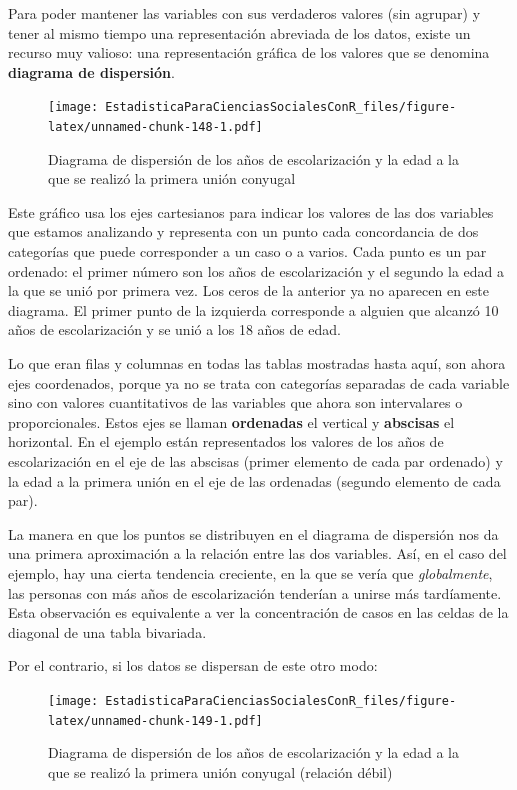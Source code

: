 \documentclass[]{book}
\begin{document}
Para poder mantener las variables con sus verdaderos valores (sin
agrupar) y tener al mismo tiempo una representación abreviada de los
datos, existe un recurso muy valioso: una representación gráfica de los valores que se denomina \textbf{diagrama de dispersión}.

\begin{figure}
\centering
\texttt{[image: EstadisticaParaCienciasSocialesConR\_files/figure-latex/unnamed-chunk-148-1.pdf]}
\caption{\label{fig:unnamed-chunk-148}Diagrama de dispersión de los años de escolarización y la edad a la que se realizó la primera unión conyugal}
\end{figure}

Este gráfico usa los ejes cartesianos para indicar los valores de las
dos variables que estamos analizando y representa con un punto cada
concordancia de dos categorías que puede corresponder a un caso o a
varios. Cada punto es un par ordenado: el primer número son los años de escolarización y el segundo la edad a la que se unió por primera vez. Los ceros de la anterior ya no aparecen en este diagrama. El primer punto de la izquierda corresponde a alguien que alcanzó 10 años de escolarización y se unió a los 18 años de edad.

Lo que eran filas y columnas en todas las tablas mostradas hasta aquí, son ahora ejes coordenados, porque ya no se trata con categorías
separadas de cada variable sino con valores cuantitativos de las
variables que ahora son intervalares o proporcionales. Estos ejes se
llaman \textbf{ordenadas} el vertical y \textbf{abscisas} el horizontal. En el
ejemplo están representados los valores de los años de escolarización en el eje de las abscisas (primer elemento de cada par ordenado) y la edad a la primera unión en el eje de las ordenadas (segundo elemento de cada par).

La manera en que los puntos se distribuyen en el diagrama de dispersión nos da una primera aproximación a la relación entre las dos variables.
Así, en el caso del ejemplo, hay una cierta tendencia creciente, en la
que se vería que \emph{globalmente}, las personas con más años de
escolarización tenderían a unirse más tardíamente. Esta observación es
equivalente a ver la concentración de casos en las celdas de la diagonal
de una tabla bivariada.

Por el contrario, si los datos se dispersan de este otro modo:

\begin{figure}
\centering
\texttt{[image: EstadisticaParaCienciasSocialesConR\_files/figure-latex/unnamed-chunk-149-1.pdf]}
\caption{\label{fig:unnamed-chunk-149}Diagrama de dispersión de los años de escolarización y la edad a la que se realizó la primera unión conyugal (relación débil)}
\end{figure}
\end{document}
